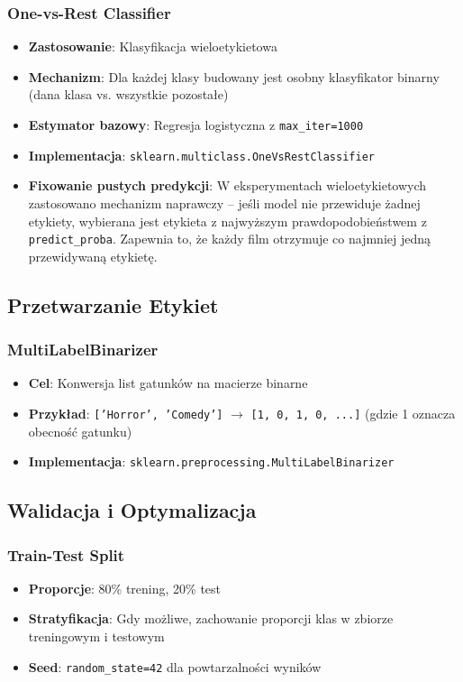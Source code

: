 \documentclass[12pt,a4paper]{article}
\begin{document}
\subsubsection{One-vs-Rest Classifier}
\begin{itemize}
    \item \textbf{Zastosowanie}: Klasyfikacja wieloetykietowa
    \item \textbf{Mechanizm}: Dla każdej klasy budowany jest osobny klasyfikator binarny (dana klasa vs. wszystkie pozostałe)
    \item \textbf{Estymator bazowy}: Regresja logistyczna z \texttt{max\_iter=1000}
    \item \textbf{Implementacja}: \texttt{sklearn.multiclass.OneVsRestClassifier}
    \item \textbf{Fixowanie pustych predykcji}: W eksperymentach wieloetykietowych zastosowano mechanizm naprawczy -- jeśli model nie przewiduje żadnej etykiety, wybierana jest etykieta z najwyższym prawdopodobieństwem z \texttt{predict\_proba}. Zapewnia to, że każdy film otrzymuje co najmniej jedną przewidywaną etykietę.
\end{itemize}

\subsection{Przetwarzanie Etykiet}

\subsubsection{MultiLabelBinarizer}
\begin{itemize}
    \item \textbf{Cel}: Konwersja list gatunków na macierze binarne
    \item \textbf{Przykład}: \texttt{['Horror', 'Comedy']} $\rightarrow$ \texttt{[1, 0, 1, 0, ...]} (gdzie 1 oznacza obecność gatunku)
    \item \textbf{Implementacja}: \texttt{sklearn.preprocessing.MultiLabelBinarizer}
\end{itemize}

\subsection{Walidacja i Optymalizacja}

\subsubsection{Train-Test Split}
\begin{itemize}
    \item \textbf{Proporcje}: 80\% trening, 20\% test
    \item \textbf{Stratyfikacja}: Gdy możliwe, zachowanie proporcji klas w zbiorze treningowym i testowym
    \item \textbf{Seed}: \texttt{random\_state=42} dla powtarzalności wyników
\end{itemize}
\end{document}
